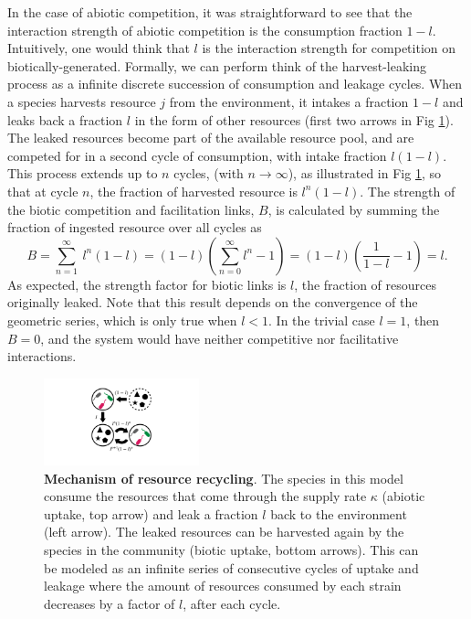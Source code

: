 \documentclass[12pt]{article}
\begin{document}
In the case of abiotic competition, it was straightforward to see that the interaction strength of abiotic competition is the consumption fraction $1-l$. Intuitively, one would think that $l$ is the interaction strength for competition on biotically-generated. Formally, we can perform think of the harvest-leaking process as a infinite discrete succession of consumption and leakage cycles. When a species harvests resource $j$ from the environment, it intakes a fraction $1-l$ and leaks back a fraction $l$ in the form of other resources (first two arrows in Fig  \ref{fig:cycling_scheme}). The leaked resources become part of the available resource pool, and are competed for in a second cycle of consumption, with intake fraction $l(1-l)$. This process extends up to $n$ cycles, (with $n \rightarrow \infty$),  as illustrated in Fig \ref{fig:cycling_scheme}, so that at cycle $n$, the fraction of harvested resource is $l^n(1-l)$. The strength of the biotic competition and facilitation links, $B$, is calculated by summing the fraction of ingested resource over all cycles as
\begin{equation*}
    B = \sum_{n = 1}^{\infty}\ l^n(1-l)= (1-l)\left(\sum_{n = 0}^\infty l^n -1\right) = (1-l)\left(\frac{1}{1-l} - 1\right) = l.
\end{equation*}
As expected, the strength factor for biotic links is $l$, the fraction of resources originally leaked. Note that this result depends on the convergence of the geometric series, which is only true when $l < 1$. In the trivial case $l = 1$, then $B = 0$, and the system would have neither competitive nor facilitative interactions.

\begin{figure}[t]
	\centering
	\includegraphics[width=0.4\textwidth]{cycling_scheme.pdf}
	\caption{\textbf{Mechanism of resource recycling}. The species in this model consume the resources that come through the supply rate $\kappa$ (abiotic uptake, top arrow) and leak a fraction $l$ back to the environment (left arrow). The leaked resources can be harvested again by the species in the community (biotic uptake, bottom arrows). This can be modeled as an infinite series of consecutive cycles of uptake and leakage where the amount of resources consumed by each strain decreases by a factor of $l$, after each cycle.}
	\label{fig:cycling_scheme}
\end{figure}
\end{document}

